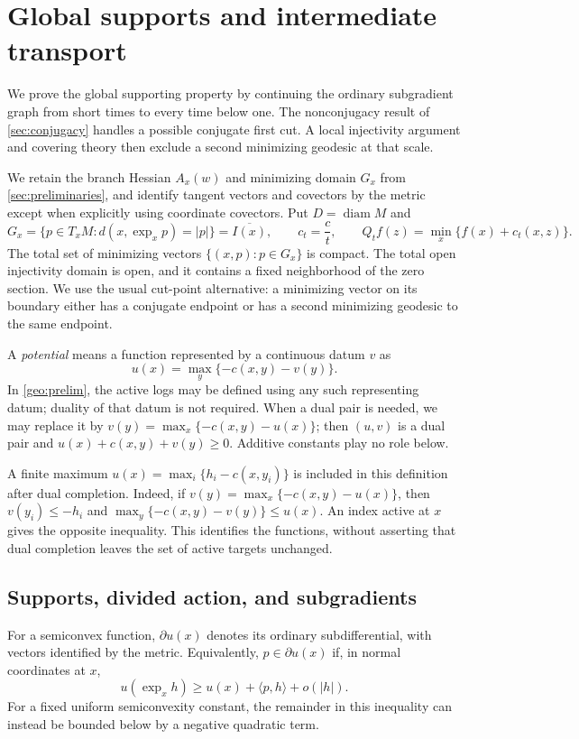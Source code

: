 \section{Global supports and intermediate transport}
\label{sec:geometry}

We prove the global supporting property by continuing the ordinary
subgradient graph from short times to every time below one.
The nonconjugacy result of \cref{sec:conjugacy} handles a possible
conjugate first cut. A local injectivity argument and covering theory
then exclude a second minimizing geodesic at that scale.

We retain the branch Hessian $A_x(w)$ and minimizing domain $G_x$
from \cref{sec:preliminaries}, and identify tangent vectors and covectors
by the metric except when explicitly using coordinate covectors.
Put $D=\operatorname{diam}M$ and
\[
 G_x=\{p\in T_xM:d(x,\exp_xp)=|p|\}=\overline{I(x)},
 \qquad c_t=\frac ct,
 \qquad Q_tf(z)=\min_x\{f(x)+c_t(x,z)\}.
\]
The total set of minimizing vectors $\{(x,p):p\in G_x\}$ is compact.
The total open injectivity domain is open, and it contains a fixed
neighborhood of the zero section.  We use the usual cut-point alternative:
a minimizing vector on its boundary either has a conjugate endpoint or
has a second minimizing geodesic to the same endpoint.

A \emph{potential} means a function represented by a continuous datum $v$ as
\[
 u(x)=\max_y\{-c(x,y)-v(y)\}.
\]
In \cref{geo:prelim}, the active logs may be defined using any such
representing datum; duality of that datum is not required. When a dual
pair is needed, we may replace it by
$v(y)=\max_x\{-c(x,y)-u(x)\}$; then $(u,v)$ is a dual pair and
$u(x)+c(x,y)+v(y)\geq0$.  Additive constants play no role below.

A finite maximum $u(x)=\max_i\{h_i-c(x,y_i)\}$ is included in this
definition after dual completion. Indeed, if
$v(y)=\max_x\{-c(x,y)-u(x)\}$, then $v(y_i)\leq-h_i$ and
$\max_y\{-c(x,y)-v(y)\}\leq u(x)$. An index active at $x$ gives the
opposite inequality. This identifies the functions, without asserting
that dual completion leaves the set of active targets unchanged.

\subsection{Supports, divided action, and subgradients}

For a semiconvex function, $\partial u(x)$ denotes its ordinary
subdifferential, with vectors identified by the metric.  Equivalently,
$p\in\partial u(x)$ if, in normal coordinates at $x$,
\[
 u(\exp_xh)\geq u(x)+\langle p,h\rangle+o(|h|).
\]
For a fixed uniform semiconvexity constant, the remainder in this
inequality can instead be bounded below by a negative quadratic term.

